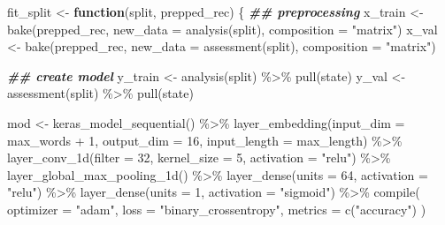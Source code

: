 \documentclass[
]{krantz}
\makeatletter
\newenvironment{Shaded}{\begin{snugshade}}{\end{snugshade}}
\newcommand{\AttributeTok}[1]{\textcolor[rgb]{0.77,0.63,0.00}{#1}}
\newcommand{\ControlFlowTok}[1]{\textcolor[rgb]{0.13,0.29,0.53}{\textbf{#1}}}
\newcommand{\DecValTok}[1]{\textcolor[rgb]{0.00,0.00,0.81}{#1}}
\newcommand{\DocumentationTok}[1]{\textcolor[rgb]{0.56,0.35,0.01}{\textbf{\textit{#1}}}}
\newcommand{\FunctionTok}[1]{\textcolor[rgb]{0.00,0.00,0.00}{#1}}
\newcommand{\NormalTok}[1]{#1}
\newcommand{\OtherTok}[1]{\textcolor[rgb]{0.56,0.35,0.01}{#1}}
\newcommand{\SpecialCharTok}[1]{\textcolor[rgb]{0.00,0.00,0.00}{#1}}
\newcommand{\StringTok}[1]{\textcolor[rgb]{0.31,0.60,0.02}{#1}}
\newenvironment{kframe}{%
\medskip{}
\setlength{\fboxsep}{.8em}
 \def\at@end@of@kframe{}%
 \ifinner\ifhmode%
  \def\at@end@of@kframe{\end{minipage}}%
  \begin{minipage}{\columnwidth}%
 \fi\fi%
 \def\FrameCommand##1{\hskip\@totalleftmargin \hskip-\fboxsep
 \colorbox{shadecolor}{##1}\hskip-\fboxsep
     \hskip-\linewidth \hskip-\@totalleftmargin \hskip\columnwidth}%
 \MakeFramed {\advance\hsize-\width
   \@totalleftmargin\z@ \linewidth\hsize
   \@setminipage}}%
 {\par\unskip\endMakeFramed%
 \at@end@of@kframe}
\renewenvironment{Shaded}{\begin{kframe}}{\end{kframe}}
\makeatother
\begin{document}
\begin{Shaded}
\begin{Highlighting}[]
\NormalTok{fit\_split }\OtherTok{\textless{}{-}} \ControlFlowTok{function}\NormalTok{(split, prepped\_rec) \{}
  \DocumentationTok{\#\# preprocessing}
\NormalTok{  x\_train }\OtherTok{\textless{}{-}} \FunctionTok{bake}\NormalTok{(prepped\_rec, }\AttributeTok{new\_data =} \FunctionTok{analysis}\NormalTok{(split),}
                  \AttributeTok{composition =} \StringTok{"matrix"}\NormalTok{)}
\NormalTok{  x\_val   }\OtherTok{\textless{}{-}} \FunctionTok{bake}\NormalTok{(prepped\_rec, }\AttributeTok{new\_data =} \FunctionTok{assessment}\NormalTok{(split),}
                  \AttributeTok{composition =} \StringTok{"matrix"}\NormalTok{)}
  
  \DocumentationTok{\#\# create model}
\NormalTok{  y\_train }\OtherTok{\textless{}{-}} \FunctionTok{analysis}\NormalTok{(split) }\SpecialCharTok{\%\textgreater{}\%} \FunctionTok{pull}\NormalTok{(state)}
\NormalTok{  y\_val   }\OtherTok{\textless{}{-}} \FunctionTok{assessment}\NormalTok{(split) }\SpecialCharTok{\%\textgreater{}\%} \FunctionTok{pull}\NormalTok{(state)}
  
\NormalTok{  mod }\OtherTok{\textless{}{-}} \FunctionTok{keras\_model\_sequential}\NormalTok{() }\SpecialCharTok{\%\textgreater{}\%}
    \FunctionTok{layer\_embedding}\NormalTok{(}\AttributeTok{input\_dim =}\NormalTok{ max\_words }\SpecialCharTok{+} \DecValTok{1}\NormalTok{, }\AttributeTok{output\_dim =} \DecValTok{16}\NormalTok{,}
                    \AttributeTok{input\_length =}\NormalTok{ max\_length) }\SpecialCharTok{\%\textgreater{}\%}
    \FunctionTok{layer\_conv\_1d}\NormalTok{(}\AttributeTok{filter =} \DecValTok{32}\NormalTok{, }\AttributeTok{kernel\_size =} \DecValTok{5}\NormalTok{, }\AttributeTok{activation =} \StringTok{"relu"}\NormalTok{) }\SpecialCharTok{\%\textgreater{}\%}
    \FunctionTok{layer\_global\_max\_pooling\_1d}\NormalTok{() }\SpecialCharTok{\%\textgreater{}\%}
    \FunctionTok{layer\_dense}\NormalTok{(}\AttributeTok{units =} \DecValTok{64}\NormalTok{, }\AttributeTok{activation =} \StringTok{"relu"}\NormalTok{) }\SpecialCharTok{\%\textgreater{}\%}
    \FunctionTok{layer\_dense}\NormalTok{(}\AttributeTok{units =} \DecValTok{1}\NormalTok{, }\AttributeTok{activation =} \StringTok{"sigmoid"}\NormalTok{) }\SpecialCharTok{\%\textgreater{}\%}
    \FunctionTok{compile}\NormalTok{(}
      \AttributeTok{optimizer =} \StringTok{"adam"}\NormalTok{,}
      \AttributeTok{loss =} \StringTok{"binary\_crossentropy"}\NormalTok{,}
      \AttributeTok{metrics =} \FunctionTok{c}\NormalTok{(}\StringTok{"accuracy"}\NormalTok{)}
\NormalTok{    )}
  

\end{Highlighting}
\end{Shaded}
\end{document}

